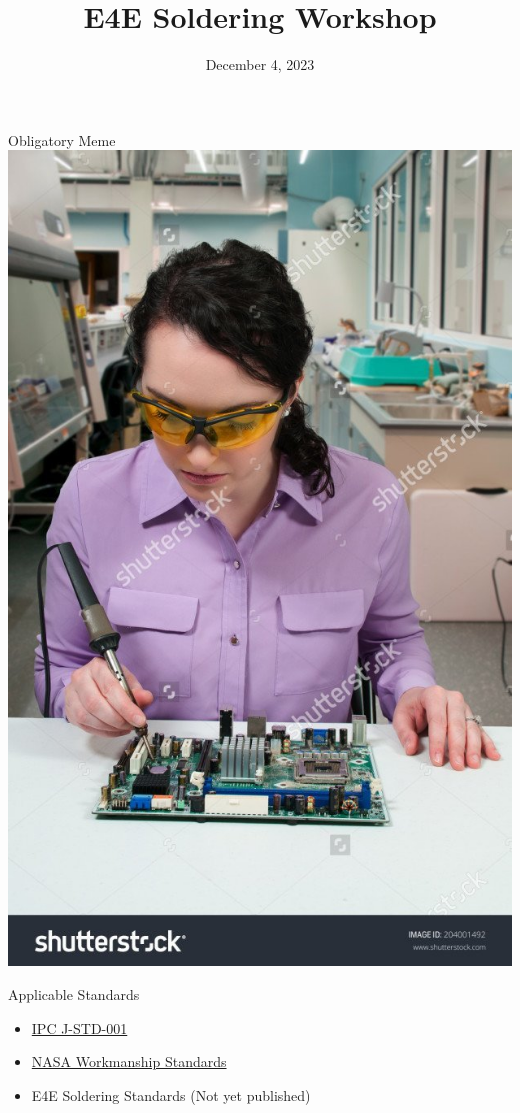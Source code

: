 \documentclass[aspectratio=169]{beamer}
\title{E4E Soldering Workshop}
\institute{Engineers for Exploration, UC San Diego}
\date{December 4, 2023}
\begin{document}
\maketitle
\begin{frame}{Obligatory Meme}
    \centering
    \includegraphics[height=0.8\textheight]{soldering_meme.jpg}
\end{frame}
\begin{frame}{Applicable Standards}
    \begin{itemize}
        \item \href{https://shop.ipc.org/ipc-j-std-001/ipc-j-std-001-standard-amendments/Revision-f/english}{IPC J-STD-001}
        \item \href{https://workmanship.nasa.gov/lib/insp/2\%20books/frameset.html}{NASA Workmanship Standards}
        \item E4E Soldering Standards (Not yet published)
    \end{itemize}
\end{frame}
\end{document}
